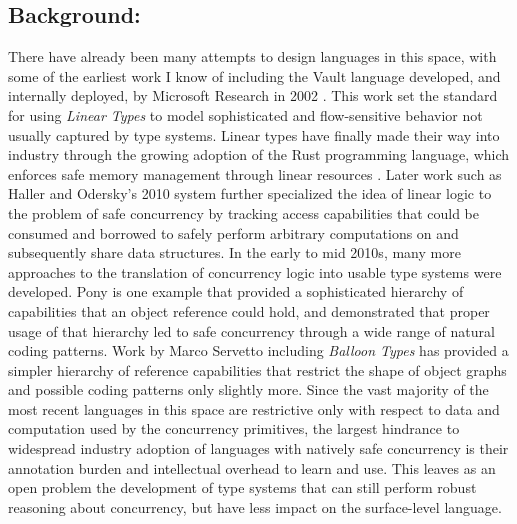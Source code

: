 \documentclass{nsf-grfp}
\begin{document}
\subsection*{Background:} There have already been many attempts to design languages in this space, with some of the earliest work I know of including the Vault language developed, and internally deployed, by Microsoft Research in 2002 \cite{vault}. This work set the standard for using \textit{Linear Types} to model sophisticated and flow-sensitive behavior not usually captured by type systems. Linear types have finally made their way into industry through the growing adoption of the Rust programming language, which enforces safe memory management through linear resources \cite{rust}. Later work such as Haller and Odersky's 2010 system \cite{haller odersky} further specialized the idea of linear logic to the problem of safe concurrency by tracking access capabilities that could be consumed and borrowed to safely perform arbitrary computations on and subsequently share data structures. In the early to mid 2010s, many more approaches to the translation of concurrency logic into usable type systems were developed. Pony \cite{pony} is one example that provided a sophisticated hierarchy of capabilities that an object reference could hold, and demonstrated that proper usage of that hierarchy led to safe concurrency through a wide range of natural coding patterns. Work by Marco Servetto including \textit{Balloon Types} \cite{balloon types} has provided a simpler hierarchy of reference capabilities that restrict the shape of object graphs and possible coding patterns only slightly more. Since the vast majority of the most recent languages in this space are restrictive only with respect to data and computation used by the concurrency primitives, the largest hindrance to widespread industry adoption of languages with natively safe concurrency is their annotation burden and intellectual overhead to learn and use. This leaves as an open problem the development of type systems that can still perform robust reasoning about concurrency, but have less impact on the surface-level language.
\end{document}
